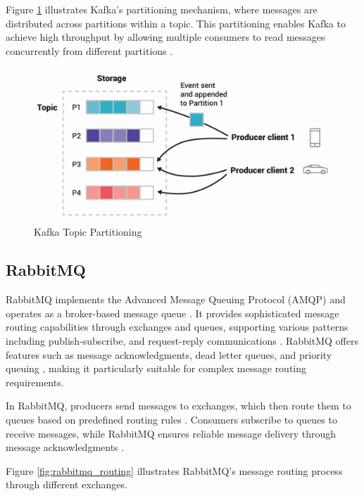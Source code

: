 Figure \ref{fig:kafka_partitioning} illustrates Kafka's partitioning mechanism, where messages are distributed across partitions within a topic. This partitioning enables Kafka to achieve high throughput by allowing multiple consumers to read messages concurrently from different partitions \cite{kafka_parallel}.
\begin{figure}[H]
    \centering
    \includegraphics[width=\textwidth]{figures/kafka_topics_partition.png}
    \caption{Kafka Topic Partitioning \cite{kafka_partitions}} 
    \label{fig:kafka_partitioning}
\end{figure}

\subsection{RabbitMQ}
RabbitMQ implements the Advanced Message Queuing Protocol (AMQP) \cite{rabbitmq_protocols} and operates as a broker-based message queue \cite{rabbitmq_definition}. It provides sophisticated message routing capabilities through exchanges and queues, supporting various patterns including publish-subscribe, and request-reply communications \cite{rabbitmq_routing}. RabbitMQ offers features such as message acknowledgments, dead letter queues, and priority queuing \cite{rabbitmq_routing}, making it particularly suitable for complex message routing requirements.

In RabbitMQ, producers send messages to exchanges, which then route them to queues based on predefined routing rules \cite{rabbitmq_routing}. Consumers subscribe to queues to receive messages, while RabbitMQ ensures reliable message delivery through message acknowledgments \cite{rabbitmq_ack}. 

Figure \ref{fig:rabbitmq_routing} illustrates RabbitMQ's message routing process through different exchanges. 

